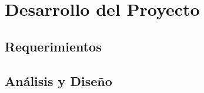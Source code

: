 \documentclass[12pt,letterpaper,spanish]{report}
\begin{document}





\chapter{Desarrollo del Proyecto}
\newpage



\section{Requerimientos}

\section{Análisis y Diseño}
\end{document}
